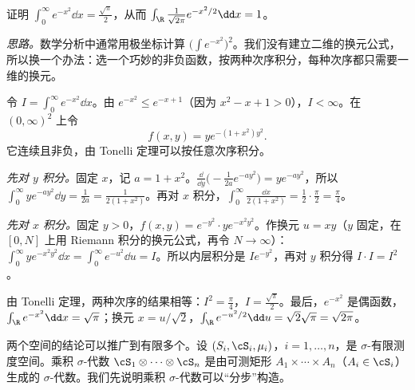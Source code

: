 \begin{workedexample}[Gauss 积分]\label{we:product:gauss}
证明 $\displaystyle\int_0^\infty e^{-x^2}\dd x=\frac{\sqrt\pi}2$，从而 $\int_\R\frac1{\sqrt{2\pi}}e^{-x^2/2}\dd x=1$。
\end{workedexample}
\begin{solution}
\emph{思路。}数学分析中通常用极坐标计算 $\bigl(\int e^{-x^2}\bigr)^2$。我们没有建立二维的换元公式，所以换一个办法：选一个巧妙的非负函数，按两种次序积分，每种次序都只需要一维的换元。

令 $I=\int_0^\infty e^{-x^2}\dd x$。由 $e^{-x^2}\leqslant e^{-x+1}$（因为 $x^2-x+1>0$），$I<\infty$。在 $(0,\infty)^2$ 上令
\[
f(x,y)=ye^{-(1+x^2)y^2}.
\]
它连续且非负，由 Tonelli 定理可以按任意次序积分。

\emph{先对 $y$ 积分。}固定 $x$，记 $a=1+x^2$。$\frac{\dd}{\dd y}\bigl(-\frac1{2a}e^{-ay^2}\bigr)=ye^{-ay^2}$，所以 $\int_0^\infty ye^{-ay^2}\dd y=\frac1{2a}=\frac1{2(1+x^2)}$。再对 $x$ 积分，$\int_0^\infty\frac{\dd x}{2(1+x^2)}=\frac12\cdot\frac\pi2=\frac\pi4$。

\emph{先对 $x$ 积分。}固定 $y>0$，$f(x,y)=e^{-y^2}\cdot ye^{-x^2y^2}$。作换元 $u=xy$（$y$ 固定，在 $[0,N]$ 上用 Riemann 积分的换元公式，再令 $N\to\infty$）：$\int_0^\infty ye^{-x^2y^2}\dd x=\int_0^\infty e^{-u^2}\dd u=I$。所以内层积分是 $Ie^{-y^2}$，再对 $y$ 积分得 $I\cdot I=I^2$。

由 Tonelli 定理，两种次序的结果相等：$I^2=\frac\pi4$，$I=\frac{\sqrt\pi}2$。最后，$e^{-x^2}$ 是偶函数，$\int_\R e^{-x^2}\dd x=\sqrt\pi$；换元 $x=u/\sqrt2$，$\int_\R e^{-u^2/2}\dd u=\sqrt2\sqrt\pi=\sqrt{2\pi}$。
\end{solution}


两个空间的结论可以推广到有限多个。设 $(S_i,\cS_i,\mu_i)$，$i=1,\dots,n$，是 $\sigma$-有限测度空间。乘积 $\sigma$-代数 $\cS_1\otimes\cdots\otimes\cS_n$ 是由可测矩形 $A_1\times\cdots\times A_n$（$A_i\in\cS_i$）生成的 $\sigma$-代数。我们先说明乘积 $\sigma$-代数可以“分步”构造。

